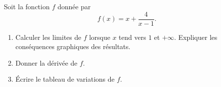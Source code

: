 
\begin{exercice}\label{exosmath-0283}

    Soit la fonction \( f\) donnée par
    \begin{equation}
        f(x)=x+\frac{ 4 }{ x-1 }.
    \end{equation}
    \begin{enumerate}
        \item
            Calculer les limites de \( f\) lorsque \( x\) tend vers \( 1\) et \( +\infty\). Expliquer les conséquences graphiques des résultats.
        \item
            Donner la dérivée de \( f\).
        \item
            Écrire le tableau de variations de \( f\).
    \end{enumerate}

\end{exercice}
